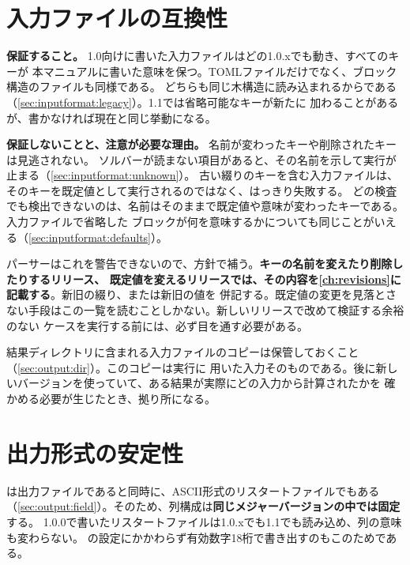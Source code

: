 \section{入力ファイルの互換性}
\label{sec:policy:compat}

\textbf{保証すること。} 1.0向けに書いた入力ファイルはどの1.0.xでも動き、すべてのキーが
本マニュアルに書いた意味を保つ。TOMLファイルだけでなく、ブロック構造のファイルも同様である。
どちらも同じ木構造に読み込まれるからである（\cref{sec:inputformat:legacy}）。1.1では省略可能なキーが新たに
加わることがあるが、書かなければ現在と同じ挙動になる。

\textbf{保証しないことと、注意が必要な理由。} 名前が変わったキーや削除されたキーは見逃されない。
ソルバーが読まない項目があると、その名前を示して実行が止まる（\cref{sec:inputformat:unknown}）。
古い綴りのキーを含む入力ファイルは、そのキーを既定値として実行されるのではなく、はっきり失敗する。
どの検査でも検出できないのは、名前はそのままで既定値や意味が変わったキーである。入力ファイルで省略した
ブロックが何を意味するかについても同じことがいえる（\cref{sec:inputformat:defaults}）。

\begin{warn}[既定値の変更は検出されないため一覧に記載する]
  パーサーはこれを警告できないので、方針で補う。\textbf{キーの名前を変えたり削除したりするリリース、
  既定値を変えるリリースでは、その内容を\cref{ch:revisions}に記載する}。新旧の綴り、または新旧の値を
  併記する。既定値の変更を見落とさない手段はこの一覧を読むことしかない。新しいリリースで改めて検証する余裕のない
  ケースを実行する前には、必ず目を通す必要がある。
\end{warn}

結果ディレクトリに含まれる入力ファイルのコピーは保管しておくこと（\cref{sec:output:dir}）。このコピーは実行に
用いた入力そのものである。後に新しいバージョンを使っていて、ある結果が実際にどの入力から計算されたかを
確かめる必要が生じたとき、拠り所になる。

\section{出力形式の安定性}
\label{sec:policy:outputs}

は出力ファイルであると同時に、ASCII形式のリスタートファイルでもある
（\cref{sec:output:field}）。そのため、列構成は\textbf{同じメジャーバージョンの中では固定}する。
1.0.0で書いたリスタートファイルは1.0.xでも1.1でも読み込め、列の意味も変わらない。
の設定にかかわらず有効数字18桁で書き出すのもこのためである。

